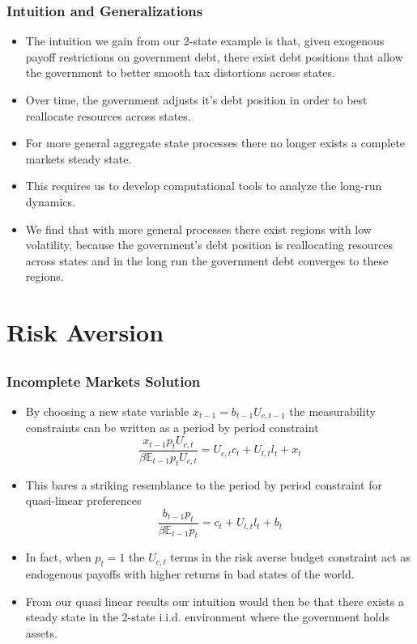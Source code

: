 \documentclass{beamer}
\newcommand{\EE}{\mathbb E}
\begin{document}
\begin{frame}
	\frametitle{Intuition and Generalizations}
	\begin{itemize}
		\item The intuition we gain from our 2-state example is that, given exogenous payoff restrictions on government debt, there exist debt positions that allow the government to better smooth tax distortions across states.
		\item  Over time, the government adjusts it's debt position in order to best reallocate resources across states.
		\item  For more general aggregate state processes there no longer exists a complete markets steady state.
		\item  This requires us to develop computational tools to analyze the long-run dynamics.
		\item  We find that with more general processes there exist regions with low volatility, because the government's debt position is reallocating resources across states and in the long run the government debt converges to these regions.
	\end{itemize}
\end{frame}

\section{Risk Aversion}
\subsection{}

 \begin{frame}
 	\frametitle{Incomplete Markets Solution}
	\begin{itemize}
	\item By choosing a new state variable $x_{t-1} = b_{t-1} U_{c,t-1}$ the measurability constraints can be written as a period by period constraint
	\[
		\frac{x_{t-1} p_t U_{c,t}}{\beta \EE_{t-1} p_t U_{c,t}}  = U_{c,t}c_t+U_{l,t} l_t + x_t
	\]
	\item  This bares a striking resemblance to the period by period constraint for quasi-linear preferences
	\[
		\frac{b_{t-1} p_t}{\beta \EE_{t-1} p_t} = c_t + U_{l,t} l_t + b_t
	\]
	\item  In fact, when $p_t =1$ the $U_{c,t}$ terms in the risk averse budget constraint act as endogenous payoffs with higher returns in bad states of the world.
	\item  From our quasi linear results our intuition would then be that there exists a steady state in the 2-state i.i.d. environment where the government holds assets.
	\end{itemize}
\end{frame}
\end{document}
